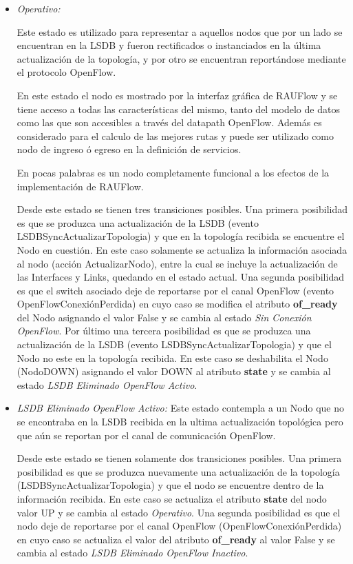 \begin{itemize}
\item \textit{Operativo:}

Este estado es utilizado para representar a aquellos nodos que por un lado se encuentran en la LSDB y fueron rectificados o instanciados en la \'ultima actualizaci\'on de la topolog\'ia, y por otro se encuentran report\'andose mediante el protocolo OpenFlow.

En este estado el nodo es mostrado por la interfaz gr\'afica de RAUFlow y se tiene acceso a todas las características del mismo, tanto del modelo de datos como las que son accesibles a trav\'es del datapath OpenFlow. Adem\'as es considerado para el calculo de las mejores rutas y puede ser utilizado como nodo de ingreso \'o egreso en la definici\'on de servicios.

En pocas palabras es un nodo completamente funcional a los efectos de la implementaci\'on de RAUFlow.

Desde este estado se tienen tres transiciones posibles. Una primera posibilidad es que se produzca una actualización de la LSDB (evento LSDBSyncActualizarTopologia) y que en la topolog\'ia recibida se encuentre el Nodo en cuesti\'on. En este caso solamente se actualiza la informaci\'on asociada al nodo (acción ActualizarNodo), entre la cual se incluye la actualización de las Interfaces y Links, quedando en el estado actual. Una segunda posibilidad es que el switch asociado deje de reportarse por el canal OpenFlow (evento OpenFlowConexiónPerdida) en cuyo caso se modifica el atributo \textbf{of\_ready} del Nodo asignando el valor False y se cambia al estado \textit{Sin Conexión OpenFlow}. Por \'ultimo una tercera posibilidad es que se produzca una actualizaci\'on de la LSDB (evento LSDBSyncActualizarTopologia) y que el Nodo no este en la topolog\'ia recibida. En este caso se deshabilita el Nodo (NodoDOWN) asignando el valor DOWN al atributo \textbf{state} y se cambia al estado \textit{LSDB Eliminado OpenFlow Activo}.

\item \textit{LSDB Eliminado OpenFlow Activo:} Este estado contempla a un Nodo que no se encontraba en la LSDB recibida en la ultima actualizaci\'on topol\'ogica pero que a\'un se reportan por el canal de comunicaci\'on OpenFlow.

Desde este estado se tienen solamente dos transiciones posibles. Una primera posibilidad es que se produzca nuevamente una actualización de la topolog\'ia 
 (LSDBSyncActualizarTopologia) y que el nodo se encuentre dentro de la información recibida. En este caso se actualiza el atributo \textbf{state} del nodo valor UP y se cambia al estado \textit{Operativo}. Una segunda posibilidad es que el nodo deje de reportarse por el canal OpenFlow (OpenFlowConexiónPerdida) en cuyo caso se actualiza el valor del atributo \textbf{of\_ready} al valor False y se cambia al estado \textit{LSDB Eliminado OpenFlow Inactivo}.


\end{itemize}
